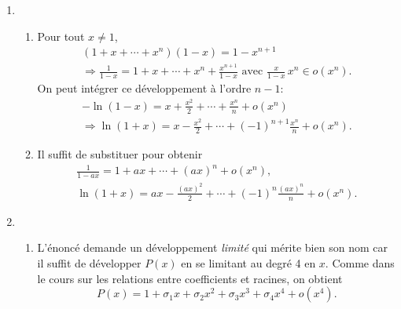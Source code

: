 \begin{enumerate}
  \item
  \begin{enumerate}
  \item Pour tout $x \neq 1$,
\begin{multline*}
  (1+x+ \cdots+x^n)(1-x) = 1- x^{n+1} \\
  \Rightarrow 
  \frac{1}{1-x} = 1+x+ \cdots+x^n + \frac{x^{n+1}}{1-x} \text{ avec } \frac{x}{1-x}\, x^{n} \in o(x^{n}). 
\end{multline*}
On peut intégrer ce développement à l'ordre $n-1$:
\begin{multline*}
  -\ln(1-x) = x + \frac{x^2}{2} + \cdots + \frac{x^n}{n} + o(x^n) \\
  \Rightarrow \ln(1 + x) = x - \frac{x^2}{2} + \cdots + (-1)^{n+1}\frac{x^n}{n} + o(x^n).
\end{multline*}

  \item Il suffit de substituer pour obtenir
\begin{multline*}
  \frac{1}{1 - ax} = 1 + ax+ \cdots +(ax)^n + o(x^n), \\
  \ln(1 + x) = ax - \frac{(ax)^2}{2} + \cdots + (-1)^n\frac{(ax)^n}{n} + o(x^n).
\end{multline*}
\end{enumerate}

  \item
  \begin{enumerate}
  \item L'énoncé demande un développement \emph{limité} qui mérite bien son nom car il suffit de développer $P(x)$ en se limitant au degré 4 en $x$. Comme dans le cours sur les relations entre coefficients et racines, on obtient
\[
  P(x) = 1 + \sigma_1 x + \sigma_2 x^2 + \sigma_3 x^3 + \sigma_4 x^4 + o(x^4).
\]


\end{enumerate}
\end{enumerate}
